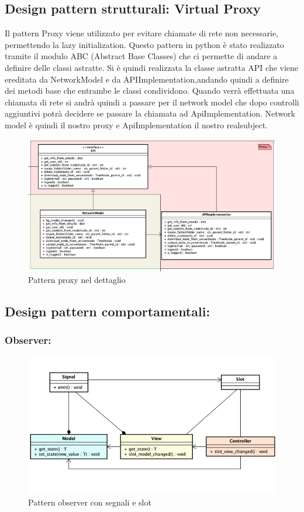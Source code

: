 \subsection{Design pattern strutturali: Virtual Proxy}
Il pattern Proxy viene utilizzato per evitare chiamate di rete non necessarie, permettendo la lazy initialization.\newline{}
Questo pattern in python è stato realizzato tramite il modulo ABC (Abstract Base Classes) che ci permette di andare a definire delle classi astratte. Si è quindi realizzata la classe astratta API che viene ereditata da NetworkModel e da APIImplementation,andando quindi a definire dei metodi base che entrambe le classi condividono. Quando verrà effettuata una chiamata di rete si andrà quindi a passare per il network model che dopo controlli aggiuntivi potrà decidere se passare la chiamata ad ApiImplementation. Network model è quindi il nostro proxy e ApiImplementation il nostro realsubject.
\begin{figure}[H]
    \centering
    \includegraphics[scale = 0.8]{components/img/proxy-model.png}
    \caption{Pattern proxy nel dettaglio}
    \label{fig:Pattern proxy nel dettaglio}
\end{figure}
\subsection{Design pattern comportamentali:}
\subsubsection{Observer:}
\begin{figure}[H]
    \centering
    \includegraphics[scale = 1]{components/img/observer-implementazione.png}
    \caption{Pattern observer con segnali e slot}
    \label{fig:Pattern observer con segnali e slot}
\end{figure}

